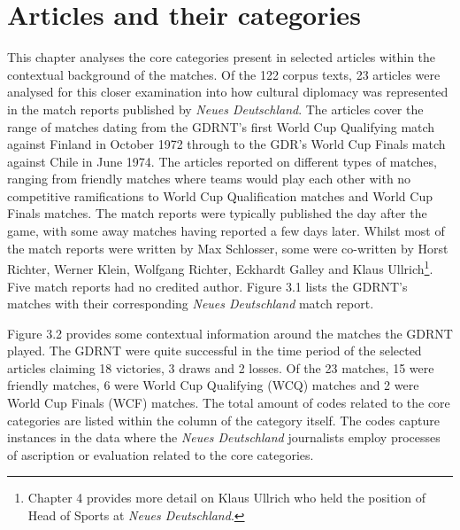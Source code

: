 \chapter{Articles and their categories\label{cha:articles}}

This chapter analyses the core categories present in selected articles within the contextual background of the matches. Of the 122 corpus texts, 23 articles were analysed for this closer examination into how cultural diplomacy was represented in the match reports published by \textit{Neues Deutschland}. The articles cover the range of matches dating from the GDRNT's first World Cup Qualifying match against Finland in October 1972 through to the GDR’s World Cup Finals match against Chile in June 1974. The articles reported on different types of matches, ranging from friendly matches where teams would play each other with no competitive ramifications to World Cup Qualification matches and World Cup Finals matches. The match reports were typically published the day after the game, with some away matches having reported a few days later. Whilst most of the match reports were written by Max Schlosser, some were co-written by Horst Richter, Werner Klein, Wolfgang Richter, Eckhardt Galley and Klaus Ullrich\footnote{Chapter 4 provides more detail on Klaus Ullrich who held the position of Head of Sports at \textit{Neues Deutschland}.}. Five match reports had no credited author. Figure 3.1 lists the GDRNT’s matches with their corresponding \textit{Neues Deutschland} match report.

Figure 3.2 provides some contextual information around the matches the GDRNT played. The GDRNT were quite successful in the time period of the selected articles claiming 18 victories, 3 draws and 2 losses. Of the 23 matches, 15 were friendly matches, 6 were World Cup Qualifying (WCQ) matches and 2 were World Cup Finals (WCF) matches. The total amount of codes related to the core categories are listed within the column of the category itself. The codes capture instances in the data where the \textit{Neues Deutschland} journalists employ processes of ascription or evaluation related to the core categories.

